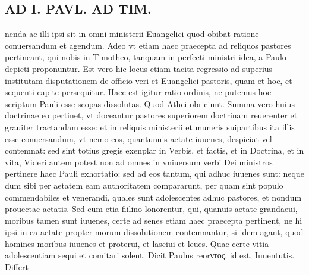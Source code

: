 \documentclass{article}
\begin{document}
\begin{pages}
\section*{AD I. PAVL. AD TIM. }
\marginpar{[ p.228 ]}\pstart nenda ac illi ipsi sit in omni ministerii Euangelici quod obibat ratione conuersandum et agendum. Adeo vt etiam haec praecepta ad reliquos pastores pertineant, qui nobis in Timotheo, tanquam in perfecti ministri idea, a Paulo depicti proponuntur. Est vero hic locus etiam tacita regressio ad superius institutam disputationem de officio veri et Euangelici pastoris, quam et hoc, et sequenti capite persequitur. Haec est igitur ratio ordinis, ne putemus hoc scriptum Pauli esse scopas dissolutas. Quod Athei obriciunt. Summa vero huius doctrinae eo pertinet, vt doceantur pastores superiorem doctrinam reuerenter et grauiter tractandam esse: et in reliquis ministerii et muneris suipartibus ita illis esse conuersandum, vt nemo eos, quantunuis aetate iuuenes, despiciat vel contemnat: sed sint totius gregis exenplar in Verbis, et factis, et in Doctrina, et in vita, Videri autem potest non ad omnes in vniuersum verbi Dei ministros pertinere haec Pauli exhortatio: sed ad eos tantum, qui adhuc iuuenes sunt: neque dum sibi per aetatem eam authoritatem compararunt, per quam sint populo commendabiles et venerandi, quales sunt adolescentes adhuc pastores, et nondum prouectae aetatis. Sed cum etia fiilino lonorentur, qui, quanuis aetate grandaeui, moribus tamen sunt iuuenes, certe ad senes etiam haec praecepta pertinent, ne hi ipsi in ea aetate propter morum dissolutionem contemnantur, si idem agant, quod homines moribus iuuenes et proterui, et lasciui et leues. Quae certe vitia adolescentiam sequi et comitari solent. Dicit Paulus reorντος, id est, Iuuentutis. Differt  \pend

\end{pages}
\end{document}
